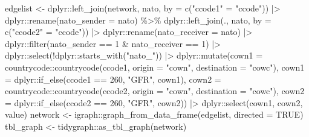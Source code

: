 \documentclass[
  12,
  letterpaper,
  DIV=11,
  numbers=noendperiod]{scrartcl}
\newenvironment{Shaded}{\begin{snugshade}}{\end{snugshade}}
\newcommand{\AttributeTok}[1]{\textcolor[rgb]{0.40,0.45,0.13}{#1}}
\newcommand{\ConstantTok}[1]{\textcolor[rgb]{0.56,0.35,0.01}{#1}}
\newcommand{\DecValTok}[1]{\textcolor[rgb]{0.68,0.00,0.00}{#1}}
\newcommand{\FunctionTok}[1]{\textcolor[rgb]{0.28,0.35,0.67}{#1}}
\newcommand{\NormalTok}[1]{\textcolor[rgb]{0.00,0.23,0.31}{#1}}
\newcommand{\OtherTok}[1]{\textcolor[rgb]{0.00,0.23,0.31}{#1}}
\newcommand{\SpecialCharTok}[1]{\textcolor[rgb]{0.37,0.37,0.37}{#1}}
\newcommand{\StringTok}[1]{\textcolor[rgb]{0.13,0.47,0.30}{#1}}
\begin{document}
\begin{Shaded}
\begin{Highlighting}[numbers=left,,]
\NormalTok{edgelist }\OtherTok{\textless{}{-}}\NormalTok{ dplyr}\SpecialCharTok{::}\FunctionTok{left\_join}\NormalTok{(network, nato, }\AttributeTok{by =} \FunctionTok{c}\NormalTok{(}\StringTok{"ccode1"} \OtherTok{=} \StringTok{"ccode"}\NormalTok{)) }\SpecialCharTok{|\textgreater{}}
\NormalTok{  dplyr}\SpecialCharTok{::}\FunctionTok{rename}\NormalTok{(}\AttributeTok{nato\_sender =}\NormalTok{ nato) }\SpecialCharTok{\%\textgreater{}\%}
\NormalTok{  dplyr}\SpecialCharTok{::}\FunctionTok{left\_join}\NormalTok{(., nato, }\AttributeTok{by =} \FunctionTok{c}\NormalTok{(}\StringTok{"ccode2"} \OtherTok{=} \StringTok{"ccode"}\NormalTok{)) }\SpecialCharTok{|\textgreater{}}
\NormalTok{  dplyr}\SpecialCharTok{::}\FunctionTok{rename}\NormalTok{(}\AttributeTok{nato\_receiver =}\NormalTok{ nato) }\SpecialCharTok{|\textgreater{}}
\NormalTok{  dplyr}\SpecialCharTok{::}\FunctionTok{filter}\NormalTok{(nato\_sender }\SpecialCharTok{==} \DecValTok{1} \SpecialCharTok{\&}\NormalTok{ nato\_receiver }\SpecialCharTok{==} \DecValTok{1}\NormalTok{) }\SpecialCharTok{|\textgreater{}}
\NormalTok{  dplyr}\SpecialCharTok{::}\FunctionTok{select}\NormalTok{(}\SpecialCharTok{!}\NormalTok{dplyr}\SpecialCharTok{::}\FunctionTok{starts\_with}\NormalTok{(}\StringTok{"nato\_"}\NormalTok{)) }\SpecialCharTok{|\textgreater{}}
\NormalTok{  dplyr}\SpecialCharTok{::}\FunctionTok{mutate}\NormalTok{(}\AttributeTok{cown1 =}\NormalTok{ countrycode}\SpecialCharTok{::}\FunctionTok{countrycode}\NormalTok{(ccode1, }\AttributeTok{origin =} \StringTok{"cown"}\NormalTok{, }\AttributeTok{destination =} \StringTok{"cowc"}\NormalTok{),}
                \AttributeTok{cown1 =}\NormalTok{ dplyr}\SpecialCharTok{::}\FunctionTok{if\_else}\NormalTok{(ccode1 }\SpecialCharTok{==} \DecValTok{260}\NormalTok{, }\StringTok{"GFR"}\NormalTok{, cown1),}
                \AttributeTok{cown2 =}\NormalTok{ countrycode}\SpecialCharTok{::}\FunctionTok{countrycode}\NormalTok{(ccode2, }\AttributeTok{origin =} \StringTok{"cown"}\NormalTok{, }\AttributeTok{destination =} \StringTok{"cowc"}\NormalTok{),}
                \AttributeTok{cown2 =}\NormalTok{ dplyr}\SpecialCharTok{::}\FunctionTok{if\_else}\NormalTok{(ccode2 }\SpecialCharTok{==} \DecValTok{260}\NormalTok{, }\StringTok{"GFR"}\NormalTok{, cown2)) }\SpecialCharTok{|\textgreater{}}
\NormalTok{  dplyr}\SpecialCharTok{::}\FunctionTok{select}\NormalTok{(cown1, cown2, value)}
\NormalTok{network }\OtherTok{\textless{}{-}}\NormalTok{ igraph}\SpecialCharTok{::}\FunctionTok{graph\_from\_data\_frame}\NormalTok{(edgelist, }\AttributeTok{directed =} \ConstantTok{TRUE}\NormalTok{)}
\NormalTok{tbl\_graph }\OtherTok{\textless{}{-}}\NormalTok{ tidygraph}\SpecialCharTok{::}\FunctionTok{as\_tbl\_graph}\NormalTok{(network)}


\end{Highlighting}
\end{Shaded}
\end{document}
